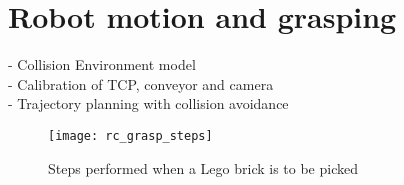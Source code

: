 \section{Robot motion and grasping}
\label{sec:rc_grasp}
- Collision Environment model\\
- Calibration of TCP, conveyor and camera\\
- Trajectory planning with collision avoidance\\

	\begin{figure}[H]
		\centering
	    \texttt{[image: rc\_grasp\_steps]}
	    \caption{Steps performed when a Lego brick is to be picked}
		\label{fig:rc_grasp}
	\end{figure}